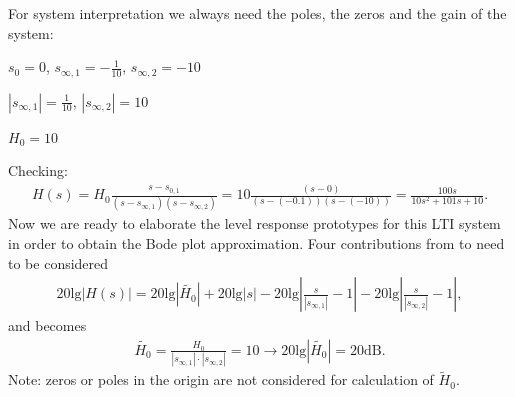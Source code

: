 \begin{ExCalc}
For system interpretation we always need the poles, the zeros and the gain of
the system:

$s_0=0$,
$s_{\infty,1}=-\frac{1}{10}$,
$s_{\infty,2}=-10$

$|s_{\infty,1}|=\frac{1}{10}$,
$|s_{\infty,2}|=10$

$H_0=10$

\begin{center}
\end{center}

Checking:
\begin{align}
H(s) = H_0\frac{s-s_{0,1}}{(s-s_{\infty,1})(s-s_{\infty,2})} = 10\frac{(s-0)}{(s-(-0.1))(s-(-10))}
=\frac{100 s}{10 s^2 + 101 s + 10}.
\end{align}
%
Now we are ready to elaborate the level response prototypes for this
LTI system in order to obtain the Bode plot approximation.
%
Four contributions from  to  need to be considered
\begin{align}
20\mathrm{lg}|H(s)| = 20\mathrm{lg}|\tilde{H_0}| + 20\mathrm{lg}|s| - 20\mathrm{lg}|\frac{s}{|s_{\infty,1}|}-1|
- 20\mathrm{lg}|\frac{s}{|s_{\infty,2}|}-1|,
\end{align}
and  becomes
\begin{align}
\tilde{H_0} = \frac{H_0}{|s_{\infty,1}| \cdot |s_{\infty,2}|} = 10 \rightarrow 20\mathrm{lg}|\tilde{H_0}| = 20 \mathrm{dB}.
\end{align}
Note: zeros or poles in the origin are not considered for calculation of $\tilde{H}_0$.
\end{ExCalc}
